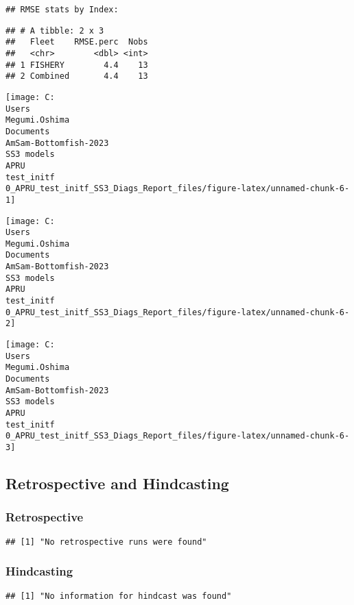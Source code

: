 \documentclass[
]{article}
\begin{document}
\begin{verbatim}
## RMSE stats by Index:
\end{verbatim}

\begin{verbatim}
## # A tibble: 2 x 3
##   Fleet    RMSE.perc  Nobs
##   <chr>        <dbl> <int>
## 1 FISHERY        4.4    13
## 2 Combined       4.4    13
\end{verbatim}

\begin{center}\texttt{[image: C:\\Users\\Megumi.Oshima\\Documents\\AmSam-Bottomfish-2023\\SS3 models\\APRU\\test\_initf\\0\_APRU\_test\_initf\_SS3\_Diags\_Report\_files/figure-latex/unnamed-chunk-6-1]} \end{center}

\begin{center}\texttt{[image: C:\\Users\\Megumi.Oshima\\Documents\\AmSam-Bottomfish-2023\\SS3 models\\APRU\\test\_initf\\0\_APRU\_test\_initf\_SS3\_Diags\_Report\_files/figure-latex/unnamed-chunk-6-2]} \end{center}

\begin{center}\texttt{[image: C:\\Users\\Megumi.Oshima\\Documents\\AmSam-Bottomfish-2023\\SS3 models\\APRU\\test\_initf\\0\_APRU\_test\_initf\_SS3\_Diags\_Report\_files/figure-latex/unnamed-chunk-6-3]} \end{center}

\hypertarget{retrospective-and-hindcasting}{%
\subsection{Retrospective and
Hindcasting}\label{retrospective-and-hindcasting}}

\hypertarget{retrospective}{%
\subsubsection{Retrospective}\label{retrospective}}

\begin{verbatim}
## [1] "No retrospective runs were found"
\end{verbatim}

\hypertarget{hindcasting}{%
\subsubsection{Hindcasting}\label{hindcasting}}

\begin{verbatim}
## [1] "No information for hindcast was found"
\end{verbatim}
\end{document}
